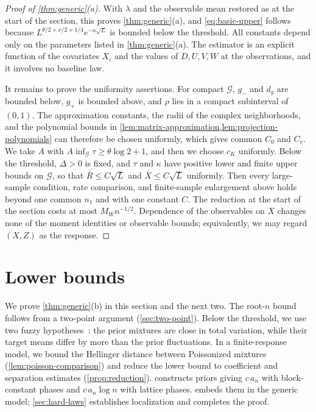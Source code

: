 \begin{proof}[Proof of \cref{thm:generic}(a)]
With $\lambda$ and the observable mean restored as at the start of the
section, this proves
\cref{thm:generic}(a), and \eqref{eq:basic-upper} follows because
$L^{\theta/2+\nu/2+1/4}e^{-\kappa\sqrt L}$ is bounded below the threshold.
All constants depend only on the parameters listed in
\cref{thm:generic}(a). The estimator is an explicit function of the covariates $X_i$ and the
values of $D,U,V,W$ at the observations, and it involves no baseline law.

It remains to prove the uniformity assertions. For compact $\mathcal G$,
$g_-$ and $d_g$ are bounded below, $g_+$ is bounded above, and $\rho$ lies
in a compact subinterval of $(0,1)$. The approximation constants, the
radii of the complex neighborhoods, and the polynomial bounds in
\cref{lem:matrix-approximation,lem:projection-polynomials} can therefore be chosen uniformly,
which gives common $C_0$ and $C_v$. We take $A$ with
$A\inf_{\mathcal G}\tau\ge\theta\log2+1$, and then we choose $c_K$
uniformly. Below the threshold, $\Delta>0$ is fixed, and $\tau$ and
$\kappa$ have positive lower and finite upper bounds on $\mathcal G$, so
that $\bar R\le C\sqrt L$ and $\bar X\le C\sqrt L$ uniformly. Then every
large-sample condition, rate comparison, and finite-sample enlargement
above holds beyond one common $n_1$ and with one constant $C$. The
reduction at the start of the section costs at most $M_Wn^{-1/2}$.
Dependence of the observables on $X$ changes none of the moment
identities or observable bounds; equivalently, we may regard $(X,Z)$ as
the response.
\end{proof}
\chapter{Lower bounds}
\label{sec:lower-ideas}
\label{sec:generic-lower}

We prove \cref{thm:generic}(b) in this section and the next two.
The root-$n$ bound follows from a two-point argument
(\cref{sec:two-point}). Below the threshold, we use two fuzzy
hypotheses~\cite[Section~2.7.4]{tsybakov}: the prior mixtures are close in
total variation, while their target means differ by more than the
prior fluctuations. In a finite-response model, we bound the
Hellinger distance between Poissonized mixtures
(\cref{lem:poisson-comparison}) and reduce the lower bound to
coefficient and separation estimates (\cref{prop:reduction}).
 constructs priors giving $c\,a_n$ with
block-constant phases and $c\,a_n\log n$ with lattice phases.
 embeds them in the generic model;
\cref{sec:hard-laws} establishes localization and completes the proof.

